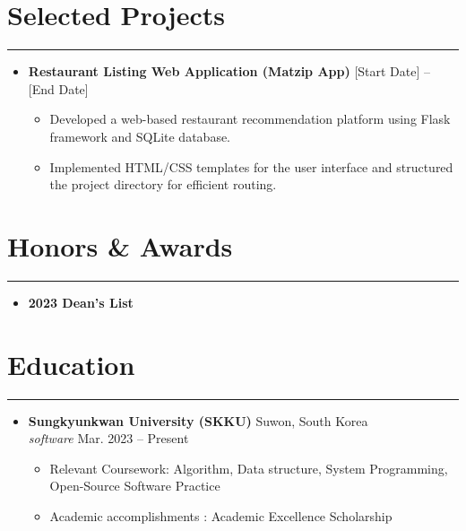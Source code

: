 \documentclass[letterpaper, 10pt]{article}
\begin{document}
\section*{Selected Projects}
\hrule
\vspace{4pt}
\begin{itemize}
\item \textbf{Restaurant Listing Web Application (Matzip App)} \hfill [Start Date] -- [End Date]
\begin{itemize}
\item Developed a web-based restaurant recommendation platform using Flask framework and SQLite database.
\item Implemented HTML/CSS templates for the user interface and structured the project directory for efficient routing.
\end{itemize}
\end{itemize}
\section*{Honors \& Awards}
\hrule
\vspace{4pt}
\begin{itemize}
\item \textbf{2023 Dean's List} 
\end{itemize}
\section*{Education}
\hrule
\vspace{4pt}
\begin{itemize}
\item \textbf{Sungkyunkwan University (SKKU)} \hfill Suwon, South Korea \\
\textit{software}  \hfill Mar. 2023 -- Present
\begin{itemize}
\item Relevant Coursework: Algorithm, Data structure, System Programming, Open-Source Software Practice
\item Academic accomplishments : Academic Excellence Scholarship
\end{itemize}
\end{itemize}
\end{document}
